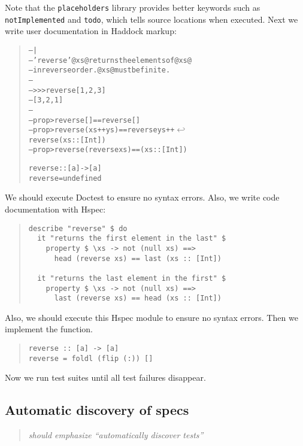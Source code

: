\documentclass[preprint]{sigplanconf}
\begin{document}
\noindent Note that the {\tt placeholders} library provides better keywords such as {\tt notImplemented} and {\tt todo}, which tells source locations when executed.
Next we write user documentation in Haddock markup:

\begin{quote}
\small
\begin{alltt}
-- |
-- 'reverse' @xs@ returns the elements of @xs@
-- in reverse order. @xs@ must be finite.
--
-- >>> reverse [1,2,3]
-- [3,2,1]
--
-- prop> reverse [] == reverse []
-- prop> reverse (xs ++ ys) == reverse ys ++ \(\hookleftarrow\)
                               reverse (xs::[Int])
-- prop> reverse (reverse xs) == (xs::[Int])

reverse :: [a] -> [a]
reverse = undefined
\end{alltt}
\end{quote}

\noindent We should execute Doctest to ensure no syntax errors.
Also, we write code documentation with Hspec:

\begin{quote}
\small
\begin{verbatim}
describe "reverse" $ do
  it "returns the first element in the last" $
    property $ \xs -> not (null xs) ==>
      head (reverse xs) == last (xs :: [Int])

  it "returns the last element in the first" $
    property $ \xs -> not (null xs) ==>
      last (reverse xs) == head (xs :: [Int])
\end{verbatim}
\end{quote}

\noindent Also, we should execute this Hspec module
to ensure no syntax errors.
Then we implement the function.

\begin{quote}
\small
\begin{verbatim}
reverse :: [a] -> [a]
reverse = foldl (flip (:)) []
\end{verbatim}
\end{quote}

\noindent Now we run test suites until
all test failures disappear.

\subsection{Automatic discovery of specs}

\begin{quote}
    \emph{should emphasize ``automatically discover tests''}
\end{quote}
\end{document}
